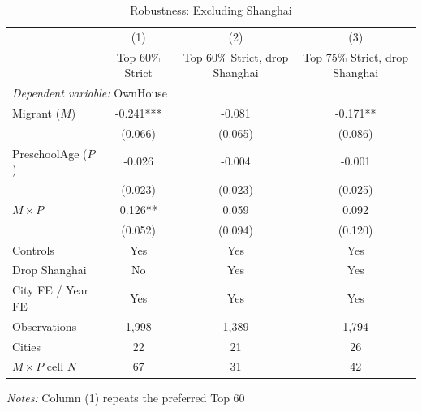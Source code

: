 \begin{table}[htbp]
\centering
\caption{Robustness: Excluding Shanghai}
\label{tab:cfps_reg2_A3}
\begin{threeparttable}
\begin{tabular}{lccc}
\toprule
 & (1) & (2) & (3) \\
 & Top 60\% Strict & Top 60\% Strict, drop Shanghai & Top 75\% Strict, drop Shanghai \\
\midrule
\multicolumn{4}{l}{\textit{Dependent variable:} OwnHouse} \\
\midrule
Migrant ($M$) & -0.241*** & -0.081 & -0.171** \\
 & (0.066) & (0.065) & (0.086) \\
PreschoolAge ($P$) & -0.026 & -0.004 & -0.001 \\
 & (0.023) & (0.023) & (0.025) \\
$M \times P$ & 0.126** & 0.059 & 0.092 \\
 & (0.052) & (0.094) & (0.120) \\
\midrule
Controls & Yes & Yes & Yes \\
Drop Shanghai & No & Yes & Yes \\
City FE / Year FE & Yes & Yes & Yes \\
Observations & 1,998 & 1,389 & 1,794 \\
Cities & 22 & 21 & 26 \\
$M \times P$ cell $N$ & 67 & 31 & 42 \\
\bottomrule
\end{tabular}
\begin{tablenotes}[flushleft]
\footnotesize
\item \textit{Notes:} Column (1) repeats the preferred Top 60\\%
\end{tablenotes}
\end{threeparttable}
\end{table}
